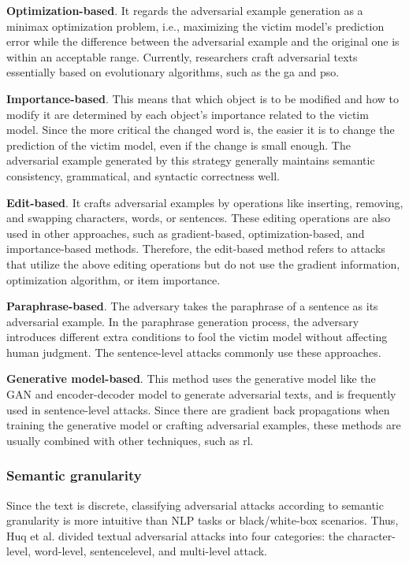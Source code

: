 \textbf{Optimization-based}. It regards the adversarial example generation as a minimax optimization problem, i.e., maximizing the victim model's prediction error while the difference between the adversarial example and the original one is within an acceptable range. Currently, researchers craft adversarial texts essentially based on evolutionary algorithms, such as the \acrshort{ga} and \acrshort{pso}.

\textbf{Importance-based}. This means that which object is to be modified and how to modify it are determined by each object's importance related to the victim model. Since the more critical the changed word is, the easier it is to change the prediction of the victim model, even if the change is small enough. The adversarial example generated by this strategy generally maintains semantic consistency, grammatical, and syntactic correctness well.

\textbf{Edit-based}. It crafts adversarial examples by operations like inserting, removing, and swapping characters, words, or sentences. These editing operations are also used in other approaches, such as gradient-based, optimization-based, and importance-based methods. Therefore, the edit-based method refers to attacks that utilize the above editing operations but do not use the gradient information, optimization algorithm, or item importance.

\textbf{Paraphrase-based}. The adversary takes the paraphrase of a sentence as its adversarial example. In the paraphrase generation process, the adversary introduces different extra conditions to fool the victim model without affecting human judgment. The sentence-level attacks commonly use these approaches.

\textbf{Generative model-based}. This method uses the generative model like the GAN and encoder-decoder model to generate adversarial texts, and is frequently used in sentence-level attacks. Since there are gradient back propagations when training the generative model or crafting adversarial examples, these methods are usually combined with other techniques, such as \acrshort{rl}.

\subsubsection{Semantic granularity}\label{subsubsec:semantic-granularity}

Since the text is discrete, classifying adversarial attacks according to semantic granularity is more intuitive than NLP tasks or black/white-box scenarios.
Thus, Huq et al. \cite{https://doi.org/10.48550/arxiv.2005.14108} divided textual adversarial attacks into four categories: the character-level, word-level, sentencelevel, and multi-level attack.

